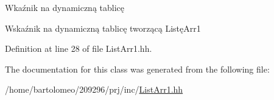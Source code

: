 Wkaźnik na dynamiczną tablicę 

Wskaźnik na dynamiczną tablicę tworzącą Listę\-Arr1 

Definition at line 28 of file List\-Arr1.\-hh.



The documentation for this class was generated from the following file\-:\begin{DoxyCompactItemize}
\item 
/home/bartolomeo/209296/prj/inc/\hyperlink{_list_arr1_8hh}{List\-Arr1.\-hh}\end{DoxyCompactItemize}

